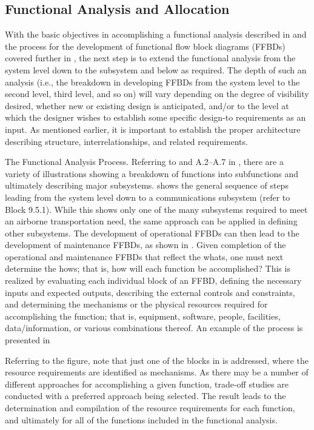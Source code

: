 \subsection{Functional Analysis and Allocation}

With the basic objectives in accomplishing a functional analysis described in and the process for the development of functional flow block diagrams (FFBDs) covered further in , the next step is to extend the functional analysis from the system level down to the subsystem and below as required. The depth of such an analysis (i.e., the breakdown in developing FFBDs from the system level to the second level, third level, and so on) will vary depending on the degree of visibility desired, whether new or existing design is anticipated, and/or to the level at which the designer wishes to establish some specific design-to requirements as an input. As mentioned earlier, it is important to establish the proper architecture describing structure, interrelationships, and related requirements.

The Functional Analysis Process. Referring to and A.2–A.7 in , there are a variety of illustrations showing a breakdown of functions into subfunctions and ultimately describing major subsystems. shows the general sequence of steps leading from the system level down to a communications subsystem (refer to Block 9.5.1). While this shows only one of the many subsystems required to meet an airborne transportation need, the same approach can be applied in defining other subsystems. The development of operational FFBDs can then lead to the development of maintenance FFBDs, as shown in . Given completion of the operational and maintenance FFBDs that reflect the whats, one must next determine the hows; that is, how will each function be accomplished? This is realized by evaluating each individual block of an FFBD, defining the necessary inputs and expected outputs, describing the external controls and constraints, and determining the mechanisms or the physical resources required for accomplishing the function; that is, equipment, software, people, facilities, data/information, or various combinations thereof. An example of the process is presented in 

Referring to the figure, note that just one of the blocks in is addressed, where the resource requirements are identified as mechanisms. As there may be a number of different approaches for accomplishing a given function, trade-off studies are conducted with a preferred approach being selected. The result leads to the determination and compilation of the resource requirements for each function, and ultimately for all of the functions included in the functional analysis.

